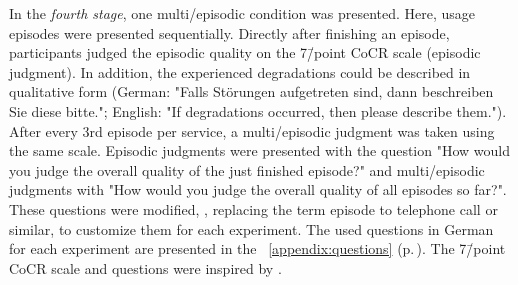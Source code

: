 In the \emph{fourth stage}, one multi\-/episodic condition was presented.
Here, usage episodes were presented sequentially.
Directly after finishing an episode, participants judged the episodic quality on the 7\=/point \ac{CoCR} scale (episodic judgment).
In addition, the experienced degradations could be described in qualitative form (German: "Falls Störungen aufgetreten sind, dann beschreiben Sie diese bitte."; English: "If degradations occurred, then please describe them.").
After every 3rd episode per service, a multi\-/episodic judgment was taken using the same scale.
Episodic judgments were presented with the question "How would you judge the overall quality of the just finished episode?" and multi\-/episodic judgments with "How would you judge the overall quality of all episodes so far?".
These questions were modified, \ie, replacing the term episode to telephone call or similar, to customize them for each experiment.
The used questions in German for each experiment are presented in the \appendix{}~\ref{appendix:questions} (p.\,\pageref{appendix:questions}).
The  7\=/point \ac{CoCR} scale and questions were inspired by \citet{moller_single-call_2011}.



